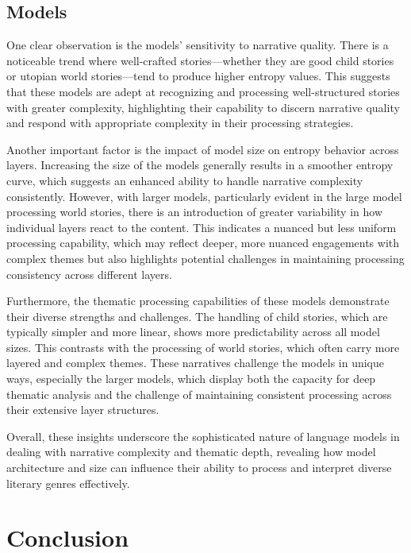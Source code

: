\documentclass{article}
\begin{document}
\subsection{Models}

One clear observation is the models' sensitivity to narrative quality. There is a noticeable trend where well-crafted stories—whether they are good child stories or utopian world stories—tend to produce higher entropy values. This suggests that these models are adept at recognizing and processing well-structured stories with greater complexity, highlighting their capability to discern narrative quality and respond with appropriate complexity in their processing strategies.

Another important factor is the impact of model size on entropy behavior across layers. Increasing the size of the models generally results in a smoother entropy curve, which suggests an enhanced ability to handle narrative complexity consistently. However, with larger models, particularly evident in the large model processing world stories, there is an introduction of greater variability in how individual layers react to the content. This indicates a nuanced but less uniform processing capability, which may reflect deeper, more nuanced engagements with complex themes but also highlights potential challenges in maintaining processing consistency across different layers.

Furthermore, the thematic processing capabilities of these models demonstrate their diverse strengths and challenges. The handling of child stories, which are typically simpler and more linear, shows more predictability across all model sizes. This contrasts with the processing of world stories, which often carry more layered and complex themes. These narratives challenge the models in unique ways, especially the larger models, which display both the capacity for deep thematic analysis and the challenge of maintaining consistent processing across their extensive layer structures.

Overall, these insights underscore the sophisticated nature of language models in dealing with narrative complexity and thematic depth, revealing how model architecture and size can influence their ability to process and interpret diverse literary genres effectively.


\section{Conclusion}
\end{document}
